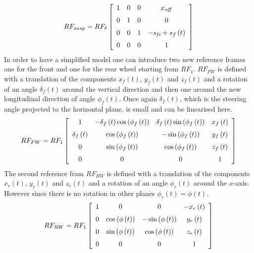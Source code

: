 %
\begin{equation}
    RF_{susp} = RF_\delta 
    \left[ \begin {array}{cccc} 1&0&0&x_{{\it off}}\\ \noalign{\medskip}0
    &1&0&0\\ \noalign{\medskip}0&0&1&-s_{{\it fs}}+s_{f} \left( t \right) 
    \\ \noalign{\medskip}0&0&0&1\end {array} \right] 
\end{equation}
%
In order to have a simplified model one can introduce two new reference frames one for the front and one for the rear wheel starting from $RF_1$. $RF_{FW}$ is defined with a translation of the components $x_f(t)$, $y_f(t)$ and $z_f(t)$ and a rotation of an angle $\delta_f(t)$ around the vertical direction and then one around the new longitudinal direction of angle $\phi_f(t)$. Once again $\delta_f(t)$, which is the steering angle projected to the horizontal plane, is small and can be linearised here.
%
\begin{equation}
    RF_{FW} = RF_1 
    \left[ \begin {array}{cccc} 1&-\delta_{f} \left( t \right) \cos
    \left( \phi_{f} \left( t \right)  \right) &\delta_{f} \left( t
    \right) \sin \left( \phi_{f} \left( t \right)  \right) &x_{f} \left( 
    t \right) \\ \noalign{\medskip}\delta_{f} \left( t \right) &\cos
    \left( \phi_{f} \left( t \right)  \right) &-\sin \left( \phi_{f}
    \left( t \right)  \right) &y_{f} \left( t \right) 
    \\ \noalign{\medskip}0&\sin \left( \phi_{f} \left( t \right)  \right) 
    &\cos \left( \phi_{f} \left( t \right)  \right) &z_{f} \left( t
    \right) \\ \noalign{\medskip}0&0&0&1\end {array} \right] 
\end{equation}
%
The second reference fram $RF_{RW}$ is defined with a translation of the components $x_r(t)$, $y_r(t)$ and $z_r(t)$ and a rotation of an angle $\phi_r(t)$ around the $x$-axis. However since there is no rotation in other planes $\phi_r(t)=\phi(t)$.
%
\begin{equation}
    RF_{RW} = RF_1 
    \left[ \begin {array}{cccc} 1&0&0&-x_{r} \left( t \right) 
    \\ \noalign{\medskip}0&\cos \left( \phi \left( t \right)  \right) &-
    \sin \left( \phi \left( t \right)  \right) &y_{r} \left( t \right) 
    \\ \noalign{\medskip}0&\sin \left( \phi \left( t \right)  \right) &
    \cos \left( \phi \left( t \right)  \right) &z_{r} \left( t \right) 
    \\ \noalign{\medskip}0&0&0&1\end {array} \right]    
\end{equation}
